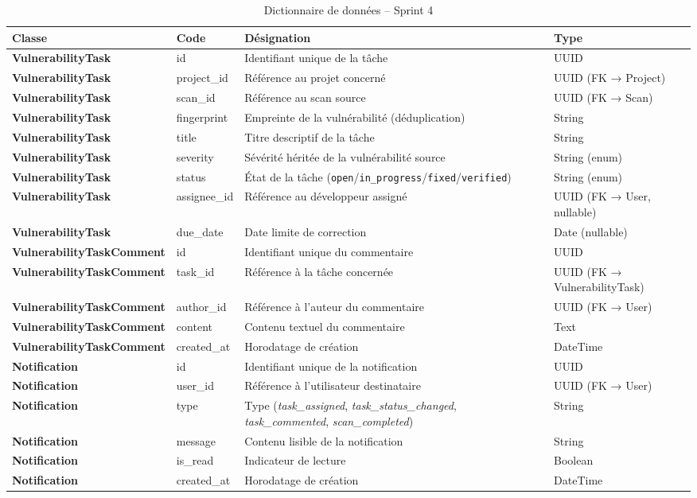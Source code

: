 \begin{table}[H]
\centering
\caption{Dictionnaire de données -- Sprint 4}
\label{tab:dict-sprint4}
\small
\renewcommand{\arraystretch}{1.3}
\begin{tabularx}{\textwidth}{>{\bfseries}p{2.8cm} p{3.2cm} X p{2.5cm}}
\hline
\rowcolor{gray!15}
\textbf{Classe} & \textbf{Code} & \textbf{Désignation} & \textbf{Type} \\
\hline
VulnerabilityTask & id & Identifiant unique de la tâche & UUID \\
VulnerabilityTask & project\_id & Référence au projet concerné & UUID (FK → Project) \\
VulnerabilityTask & scan\_id & Référence au scan source & UUID (FK → Scan) \\
VulnerabilityTask & fingerprint & Empreinte de la vulnérabilité (déduplication) & String \\
VulnerabilityTask & title & Titre descriptif de la tâche & String \\
VulnerabilityTask & severity & Sévérité héritée de la vulnérabilité source & String (enum) \\
VulnerabilityTask & status & État de la tâche (\texttt{open}/\texttt{in\_progress}/\texttt{fixed}/\texttt{verified}) & String (enum) \\
VulnerabilityTask & assignee\_id & Référence au développeur assigné & UUID (FK → User, nullable) \\
VulnerabilityTask & due\_date & Date limite de correction & Date (nullable) \\
\hline
VulnerabilityTaskComment & id & Identifiant unique du commentaire & UUID \\
VulnerabilityTaskComment & task\_id & Référence à la tâche concernée & UUID (FK → VulnerabilityTask) \\
VulnerabilityTaskComment & author\_id & Référence à l'auteur du commentaire & UUID (FK → User) \\
VulnerabilityTaskComment & content & Contenu textuel du commentaire & Text \\
VulnerabilityTaskComment & created\_at & Horodatage de création & DateTime \\
\hline
Notification & id & Identifiant unique de la notification & UUID \\
Notification & user\_id & Référence à l'utilisateur destinataire & UUID (FK → User) \\
Notification & type & Type (\textit{task\_assigned}, \textit{task\_status\_changed}, \textit{task\_commented}, \textit{scan\_completed}) & String \\
Notification & message & Contenu lisible de la notification & String \\
Notification & is\_read & Indicateur de lecture & Boolean \\
Notification & created\_at & Horodatage de création & DateTime \\
\hline
\end{tabularx}
\end{table}

